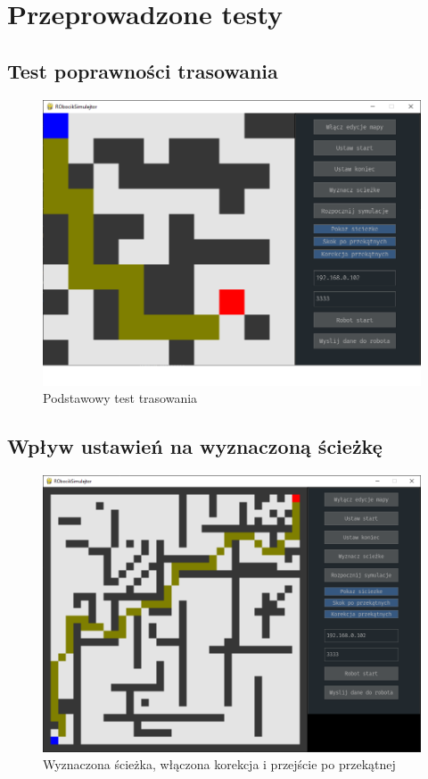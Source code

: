 \section{Przeprowadzone testy}

\subsection{Test poprawności trasowania}

\begin{figure}[H]
	\centering
	\includegraphics[width=13cm]{pages/testy/zdjecia/t1_1.png}
	\caption{Podstawowy test trasowania}
	\label{Fig:schematSerweraTCP}
\end{figure}




\subsection{Wpływ ustawień na wyznaczoną ścieżkę}

\begin{figure}[H]
	\centering
	\includegraphics[width=13cm]{pages/testy/zdjecia/t2_1.png}
	\caption{Wyznaczona ścieżka, włączona korekcja i przejście po przekątnej}
	\label{Fig:test21}
\end{figure}


